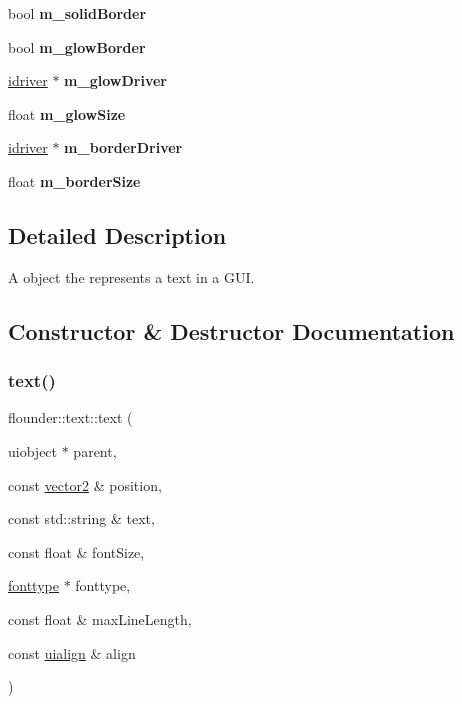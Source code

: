 \begin{DoxyCompactItemize}
bool {\bfseries m\+\_\+solid\+Border}
\item 
\mbox{\label{classflounder_1_1text_a2ade77fa608fd90ae7e6ec53ae79f3fc}} 
bool {\bfseries m\+\_\+glow\+Border}
\item 
\mbox{\label{classflounder_1_1text_a44fbfde14b3aeda62fbac94e476356cb}} 
\hyperlink{classflounder_1_1idriver}{idriver} $\ast$ {\bfseries m\+\_\+glow\+Driver}
\item 
\mbox{\label{classflounder_1_1text_aa4223814320165f082a133b61750c9d5}} 
float {\bfseries m\+\_\+glow\+Size}
\item 
\mbox{\label{classflounder_1_1text_a8d3493c46a99c6985f5286ad2f202279}} 
\hyperlink{classflounder_1_1idriver}{idriver} $\ast$ {\bfseries m\+\_\+border\+Driver}
\item 
\mbox{\label{classflounder_1_1text_a13d088a95fe0743d78eccc6bf0b9430c}} 
float {\bfseries m\+\_\+border\+Size}
\end{DoxyCompactItemize}


\subsection{Detailed Description}
A object the represents a text in a G\+UI. 



\subsection{Constructor \& Destructor Documentation}
\mbox{\label{classflounder_1_1text_a4b99960617867cc5159778aa42d99a19}} 
\subsubsection{\texorpdfstring{text()}{text()}}
{\footnotesize\ttfamily flounder\+::text\+::text (\begin{DoxyParamCaption}\item[{uiobject $\ast$}]{parent,  }\item[{const \hyperlink{classflounder_1_1vector2}{vector2} \&}]{position,  }\item[{const std\+::string \&}]{text,  }\item[{const float \&}]{font\+Size,  }\item[{\hyperlink{classflounder_1_1fonttype}{fonttype} $\ast$}]{fonttype,  }\item[{const float \&}]{max\+Line\+Length,  }\item[{const \hyperlink{namespaceflounder_a70f1871d5c05aa8e078dd37501ce10a9}{uialign} \&}]{align }\end{DoxyParamCaption})}



